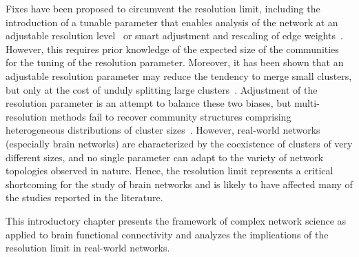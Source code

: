 Fixes have been proposed to circumvent the resolution limit, including the introduction of a tunable parameter that enables analysis of the network at an adjustable resolution level~\cite{reichardt2006,ronhovde2010,yeo2011} or smart adjustment and rescaling of edge weights~\cite{berry2011}.
However, this requires prior knowledge of the expected size of the communities for the tuning of the resolution parameter. Moreover, it has been shown that an adjustable resolution parameter may reduce the tendency to merge small clusters, but only at the cost of unduly splitting large clusters~\cite{lancichinetti2011}. Adjustment of the resolution parameter is an attempt to balance these two biases, but multi-resolution methods fail to recover community structures comprising heterogeneous distributions of cluster sizes~\cite{lancichinetti2011}. 
However, real-world networks (especially brain networks) are characterized by the coexistence of clusters of very different sizes, and no single parameter can adapt to the variety of network topologies observed in nature.
Hence, the resolution limit represents a critical shortcoming for the study of brain networks and is likely to have affected many of the studies reported in the literature.

This introductory chapter presents the framework of complex network science as applied to brain functional connectivity and analyzes the implications of the resolution limit in real-world networks.


